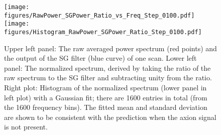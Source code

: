 \begin{figure} [htbp]
  \centering
  \texttt{[image: figures/RawPower\_SGPower\_Ratio\_vs\_Freq\_Step\_0100.pdf]}
  \texttt{[image: figures/Histogram\_RawPower\_SGPower\_Ratio\_Step\_0100.pdf]}
  \caption{Upper left panel: The raw averaged power spectrum (red points) and the 
output of the SG filter (blue curve) of one scan. Lower left panel: The normalized 
spectrum,  derived by taking the ratio of the raw spectrum to the SG filter 
and subtracting unity from the ratio.
Right plot: Histogram of the normalized spectrum (lower panel in left plot) with a Gaussian 
fit; there are 1600 entries in total (from the 1600 frequency bins). 
The fitted mean and standard deviation are shown to be consistent with the prediction 
when the axion signal is not present.}
  \label{fig:raw_sg_power}
\end{figure}







